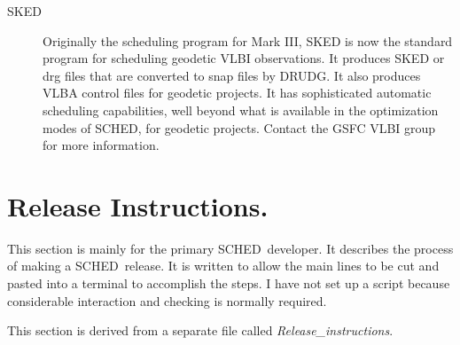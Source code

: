 \documentclass{report}
\newcommand{\sched}{{\sc SCHED}}
\newcommand{\schedb}{{\sc SCHED~}}
\begin{document}
\begin{description}

\item [{\sc SKED}] Originally the scheduling program for Mark III,
{\sc SKED} is now the standard program for scheduling geodetic VLBI
observations.  It produces {\sc SKED} or drg files that are converted
to snap files by {\sc DRUDG}.  It also produces VLBA control files for
geodetic projects.  It has sophisticated automatic scheduling
capabilities, well beyond what is available in the optimization modes
of \sched, for geodetic projects.  Contact the GSFC VLBI group for
more information.

\end{description}


\section{\label{SEC:RELEASE}Release Instructions.}

This section is mainly for the primary \schedb developer.  It describes
the process of making a \schedb release.  It is written to allow the
main lines to be cut and pasted into a terminal to accomplish the
steps.  I have not set up a script because considerable interaction
and checking is normally required.

This section is derived from a separate file called {\sl
Release\_instructions}.
\end{document}

